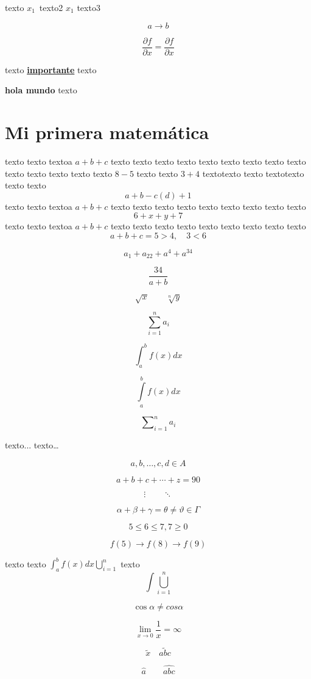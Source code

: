 \documentclass{report}
\newcommand*{\fd}{\longrightarrow}
\newcommand{\sbf}{\sffamily\bfseries}
\newcommand{\impo}[1]{\textbf{\underline{#1}}}
\newcommand{\parc}[2]{\frac{\partial#1}{\partial#2}}
\newcommand{\pl}{\ensuremath{x_1}}
\begin{document}
	
texto \pl\ texto2 $\pl$ texto3

$$
a\fd b
$$

$$
\parc{f}{x}=\frac{\partial f}{\partial x}
$$

texto \impo{importante} texto

{\sbf hola mundo} texto
	
\setcounter{chapter}{4}
	
\chapter{Mi primera matemática}
	
texto texto textoa $a+b+c$ texto texto texto texto texto texto texto texto texto texto texto texto texto texto $8-5$ texto texto \(3+4\) textotexto texto textotexto texto texto	 
\[a+b-c(d)+1\]
texto texto textoa $a+b+c$ texto texto texto texto texto texto texto texto texto 
$$
6+x+y+7
$$
texto texto textoa $a+b+c$ texto texto texto texto texto texto texto texto texto 
\begin{equation}
a+b+c=5>4,\quad 3<6
\end{equation}

$$
a_1+ a_{22}+a^4+ a^{34}
$$

$$
\frac{34}{a+b}
$$

$$
\sqrt{x}\qquad \sqrt[n]{y}
$$

$$
\sum_{i=1}^n a_i
$$

$$
\int_a^b f(x)dx
$$

$$
\int\limits_a^b f(x)dx
$$

$$
\sum\nolimits_{i=1}^n a_i
$$
	
texto... \qquad texto\dots 
	
$$
a,b,\ldots,c,d\in A
$$

$$
a+b+c+\cdots+z =90
$$

$$
\vdots\qquad \ddots
$$

$$
\alpha +\beta + \gamma=\theta \neq \vartheta\in \Gamma
$$

$$
5\le 6\leq 7, 7\geq 0
$$

$$
f(5)\to f(8)\longrightarrow f(9)
$$

\newpage

texto texto $\int_a^b f(x)dx\bigcup_{i=1}^n$ texto
$$
\int\bigcup_{i=1}^n
$$

$$
\cos\alpha\neq cos\alpha
$$

$$
\lim_{x\to 0}\frac{1}{x}=\infty
$$

$$
\tilde{x}\quad \widetilde{abc}
$$

$$
\hat{a}\qquad \widehat{abc}
$$
\end{document}

